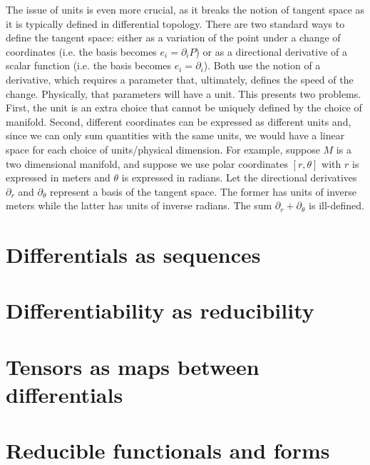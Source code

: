 \documentclass[10pt,twocolumn, nofootinbib]{revtex4-2}
\begin{document}
The issue of units is even more crucial, as it breaks the notion of tangent space as it is typically defined in differential topology. There are two standard ways to define the tangent space: either as a variation of the point under a change of coordinates (i.e. the basis becomes $e_i = \partial_i P$) or as a directional derivative of a scalar function (i.e. the basis becomes $e_i = \partial_i$). Both use the notion of a derivative, which requires a parameter that, ultimately, defines the speed of the change. Physically, that parameters will have a unit. This presents two problems. First, the unit is an extra choice that cannot be uniquely defined by the choice of manifold. Second, different coordinates can be expressed as different units and, since we can only sum quantities with the same units, we would have a linear space for each choice of units/physical dimension. For example, suppose $M$ is a two dimensional manifold, and suppose we use polar coordinates $[r, \theta]$ with $r$ is expressed in meters and $\theta$ is expressed in radians. Let the directional derivatives $\partial_r$ and $\partial_\theta$ represent a basis of the tangent space. The former has units of inverse meters while the latter has units of inverse radians. The sum $\partial_r + \partial_\theta$ is ill-defined. 


\section{Differentials as sequences}

\section{Differentiability as reducibility}

\section{Tensors as maps between differentials}

\section{Reducible functionals and forms}


\end{document}

